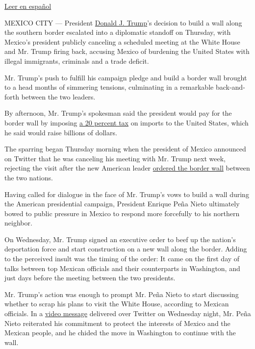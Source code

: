 \href{https://www.nytimes.com/es/2017/01/26/el-presidente-mexicano-enrique-pena-nieto-cancela-su-visita-a-washington/}{Leer
en español}

MEXICO CITY --- President
\href{http://www.nytimes.com/topic/person/donald-trump?inline=nyt-per}{Donald
J. Trump}'s decision to build a wall along the southern border escalated
into a diplomatic standoff on Thursday, with Mexico's president publicly
canceling a scheduled meeting at the White House and Mr. Trump firing
back, accusing Mexico of burdening the United States with illegal
immigrants, criminals and a trade deficit.

Mr. Trump's push to fulfill his campaign pledge and build a border wall
brought to a head months of simmering tensions, culminating in a
remarkable back-and-forth between the two leaders.

By afternoon, Mr. Trump's spokesman said the president would pay for the
border wall by imposing
\href{https://www.nytimes.com/2017/01/26/us/politics/mexico-wall-tax-trump.html?action=Click\&contentCollection=BreakingNews\&contentID=64842749\&pgtype=Homepage}{a
20 percent tax} on imports to the United States, which he said would
raise billions of dollars.

The sparring began Thursday morning when the president of Mexico
announced on Twitter that he was canceling his meeting with Mr. Trump
next week, rejecting the visit after the new American leader
\href{https://www.nytimes.com/2017/01/25/us/politics/refugees-immigrants-wall-trump.html}{ordered
the border wall} between the two nations.

Having called for dialogue in the face of Mr. Trump's vows to build a
wall during the American presidential campaign, President Enrique Peña
Nieto ultimately bowed to public pressure in Mexico to respond more
forcefully to his northern neighbor.

On Wednesday, Mr. Trump signed an executive order to beef up the
nation's deportation force and start construction on a new wall along
the border. Adding to the perceived insult was the timing of the order:
It came on the first day of talks between top Mexican officials and
their counterparts in Washington, and just days before the meeting
between the two presidents.

Mr. Trump's action was enough to prompt Mr. Peña Nieto to start
discussing whether to scrap his plans to visit the White House,
according to Mexican officials. In a
\href{https://twitter.com/EPN/status/824447050066468865}{video message}
delivered over Twitter on Wednesday night, Mr. Peña Nieto reiterated his
commitment to protect the interests of Mexico and the Mexican people,
and he chided the move in Washington to continue with the wall.


